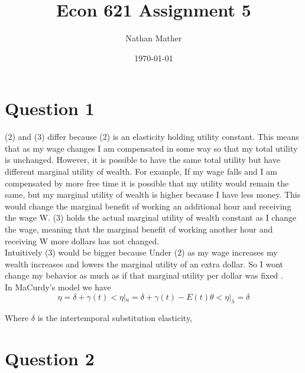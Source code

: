 \documentclass[11pt]{article}
\title{Econ 621 Assignment 5} %
\author{Nathan Mather} %
\date{\today} %
\begin{document}
	
\maketitle %

\setcounter{tocdepth}{2} %




\section{Question 1}

(2) and (3) differ because (2) is an elasticity holding utility constant. This means that as my wage changes I am compensated in some way so that my total utility is unchanged. However, it is possible to have the same total utility but have different marginal utility of wealth. For example, If my wage falls and I am compensated by more free time it is possible that my utility would remain the same, but my marginal utility of wealth is higher because I have less money. This would change the marginal benefit of working an additional hour and receiving the wage W. (3) holds the actual marginal utility of wealth constant as I change the wage, meaning that the marginal benefit of working another hour and receiving W more dollars has not changed. \\

Intuitively (3) would be bigger because Under (2) as my wage increases my wealth increases and lowers the marginal utility of an extra dollar. So I wont change my behavior as much as if that marginal utility per dollar was fixed . \\

In MaCurdy's model we have 
$$ \eta = \delta+\gamma(t) < \eta |_u = \delta + \gamma(t) -E(t) \theta < \eta|_{\lambda} = \delta
$$

Where $\delta$ is the intertemporal substitution elasticity, 



\section{Question 2}
\end{document}
